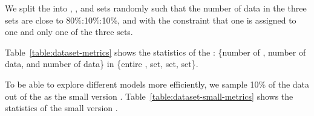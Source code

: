 We split the \dataset into \train, \val, and \test sets randomly such
that the number of \evo data in the three sets are close to
80\%:10\%:10\%, and with the constraint that one \repo is assigned to
one and only one of the three sets.




Table~\ref{table:dataset-metrics} shows the statistics of the
\dataset: \{number of \repos, number of \evo data, and number of \lat
data\} in \{entire \dataset, \train set, \val set, \test set\}.

To be able to explore different models more efficiently, we sample
10\% of the data out of the \dataset as the small version \dataset.
Table~\ref{table:dataset-small-metrics} shows the statistics of the
small version \dataset.
